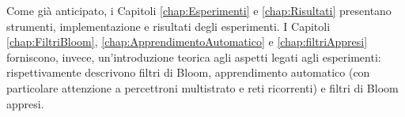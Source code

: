 \documentclass[../../main.tex]{subfiles}
\begin{document}
    Come già anticipato, i Capitoli \ref{chap:Esperimenti} e \ref{chap:Risultati} presentano strumenti, implementazione e risultati degli esperimenti. I Capitoli \ref{chap:FiltriBloom}, \ref{chap:ApprendimentoAutomatico} e \ref{chap:filtriAppresi} forniscono, invece, un'introduzione teorica agli aspetti legati agli esperimenti: rispettivamente descrivono filtri di Bloom, apprendimento automatico (con particolare attenzione a percettroni multistrato e reti ricorrenti) e filtri di Bloom appresi.
\end{document}
